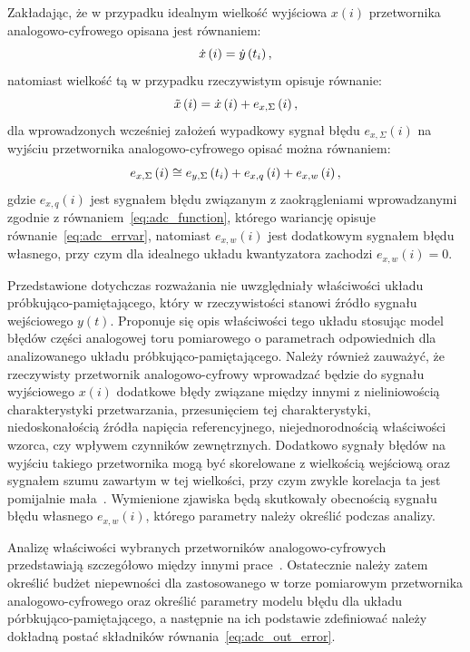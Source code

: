 Zakładając, że w przypadku idealnym wielkość wyjściowa $x(i)$ przetwornika analogowo-cyfrowego opisana jest równaniem:
\begin{equation}
\dot{x} \left(i\right) = \dot{y} \left(t_{i}\right) \label{eq:adc_out_ideal},
\end{equation}
natomiast wielkość tą w przypadku rzeczywistym opisuje równanie:
\begin{equation}
\tilde{x} \left(i\right) = \dot{x} \left(i\right) + e_{x,\Sigma} \left(i\right) \label{eq:adc_out_real},
\end{equation}
dla wprowadzonych wcześniej założeń wypadkowy sygnał błędu $e_{x,\Sigma}(i)$ na wyjściu przetwornika analogowo-cyfrowego opisać można równaniem: 
\begin{equation}
e_{x,\Sigma} \left(i\right) \cong e_{y,\Sigma} \left(t_{i}\right) + e_{x,q} \left(i\right) + e_{x,w} \left(i\right) \label{eq:adc_out_error},
\end{equation}
gdzie $e_{x,q}(i)$ jest sygnałem błędu związanym z zaokrągleniami wprowadzanymi zgodnie z równaniem~\eqref{eq:adc_function}, którego wariancję opisuje równanie~\eqref{eq:adc_errvar}, natomiast $e_{x,w}(i)$ jest dodatkowym sygnałem błędu własnego, przy czym dla idealnego układu kwantyzatora zachodzi $e_{x,w}(i) = 0$.

Przedstawione dotychczas rozważania nie uwzględniały właściwości układu próbkująco-pamiętającego, który w rzeczywistości stanowi źródło sygnału wejściowego $y(t)$. Proponuje się opis właściwości tego układu stosując model błędów części analogowej toru pomiarowego o parametrach odpowiednich dla analizowanego układu próbkująco-pamiętającego. Należy również zauważyć, że rzeczywisty przetwornik analogowo-cyfrowy wprowadzać będzie do sygnału wyjściowego $x(i)$ dodatkowe błędy związane między innymi z nieliniowością charakterystyki przetwarzania, przesunięciem tej charakterystyki, niedoskonałością źródła napięcia referencyjnego, niejednorodnością właściwości wzorca, czy wpływem czynników zewnętrznych. Dodatkowo sygnały błędów na wyjściu takiego przetwornika mogą być skorelowane z wielkością wejściową oraz sygnałem szumu zawartym w tej wielkości, przy czym zwykle korelacja ta jest pomijalnie mała~\cite{sienkowski_adc}. Wymienione zjawiska będą skutkowały obecnością sygnału błędu własnego $e_{x,w}(i)$, którego parametry należy określić podczas analizy.

Analizę właściwości wybranych przetworników analogowo-cyfrowych przedstawiają szczegółowo między innymi prace~\cite{jakubiec_przetwarzanie, jakubiec_system, sienkowski_adc, sienkowski_kwant, arpaia_deltasigma}. Ostatecznie należy zatem określić budżet niepewności dla zastosowanego w torze pomiarowym przetwornika analogowo-cyfrowego oraz określić parametry modelu błędu dla układu pórbkująco-pamiętającego, a następnie na ich podstawie zdefiniować należy dokładną postać składników równania~\eqref{eq:adc_out_error}.

